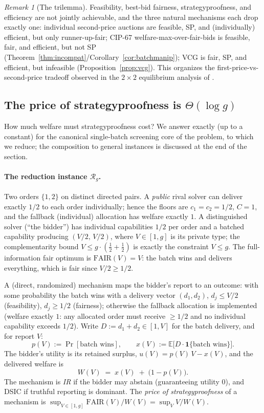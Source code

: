 \documentclass[11pt]{article}
\theoremstyle{remark}
\newtheorem{remark}{Remark}
\newcommand{\FAIR}{\mathrm{FAIR}}
\newcommand{\E}{\mathbb{E}}
\begin{document}
\begin{remark}[The trilemma]\label{rem:trilemma}
Feasibility, best-bid fairness, strategyproofness, and efficiency are not
jointly achievable, and the three natural mechanisms each drop exactly one:
individual second-price auctions are feasible, SP, and (individually)
efficient, but only runner-up-fair; CIP-67 welfare-max-over-fair-bids is
feasible, fair, and efficient, but not SP
(Theorem~\ref{thm:incompat}/Corollary~\ref{cor:batchmanip}); VCG is fair,
SP, and efficient, but infeasible (Proposition~\ref{prop:vcg}). This
organizes the first-price-vs-second-price tradeoff observed in the
$2\times2$ equilibrium analysis of \cite{canidio2024}.
\end{remark}

\subsection{The price of strategyproofness is \texorpdfstring{$\Theta(\log g)$}{Theta(log g)}}
\label{sec:posp}

How much welfare must strategyproofness cost? We answer exactly (up to a
constant) for the canonical single-batch screening core of the problem, to
which we reduce; the composition to general instances is discussed at the
end of the section.

\paragraph{The reduction instance $\mathcal{R}_g$.}
Two orders $\{1,2\}$ on distinct directed pairs. A \emph{public} rival
solver can deliver exactly $1/2$ to each order individually; hence the
floors are $c_1=c_2=1/2$, $C=1$, and the fallback (individual) allocation
has welfare exactly $1$. A distinguished solver (``the bidder'') has
individual capabilities $1/2$ per order and a batched capability producing
$(V/2,\,V/2)$, where $V\in[1,g]$ is its private type; the complementarity
bound $V\le g\cdot(\tfrac12+\tfrac12)$ is exactly the constraint $V\le g$.
The full-information fair optimum is $\FAIR(V)=V$: the batch wins and
delivers everything, which is fair since $V/2\ge1/2$.

A (direct, randomized) mechanism maps the bidder's report to an outcome:
with some probability the batch wins with a delivery vector $(d_1,d_2)$,
$d_j\le V/2$ (feasibility), $d_j\ge 1/2$ (fairness); otherwise the fallback
allocation is implemented (welfare exactly $1$: any allocated order must
receive $\ge1/2$ and no individual capability exceeds $1/2$). Write
$D:=d_1+d_2\in[1,V]$ for the batch delivery, and for report $V$:
\[
p(V):=\Pr[\text{batch wins}],\qquad
x(V):=\E\big[D\cdot\mathbf{1}\{\text{batch wins}\}\big].
\]
The bidder's utility is its retained surplus,
$u(V)=p(V)\,V-x(V)$, and the delivered welfare is
\[
W(V)\;=\;x(V)\;+\;\big(1-p(V)\big).
\]
The mechanism is \emph{IR} if the bidder may abstain (guaranteeing utility
$0$), and DSIC if truthful reporting is dominant. The \emph{price of
strategyproofness} of a mechanism is
$\sup_{V\in[1,g]}\FAIR(V)/W(V)=\sup_V V/W(V)$.
\end{document}

